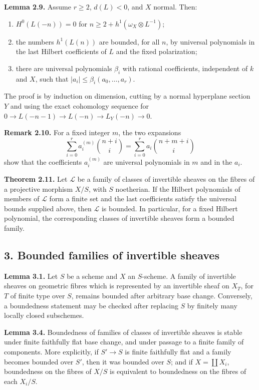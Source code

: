 \documentclass[11pt]{article}
\begin{document}
\textbf{Lemma 2.9.} Assume $r\ge2$, $d(L)<0$, and $X$ normal. Then:
\begin{enumerate}[label=\roman*)]
\item $H^0(L(-n))=0$ for $n\ge 2+h^1(\omega_X\otimes L^{-1})$;
\item the numbers $h^1(L(n))$ are bounded, for all $n$, by universal polynomials in the last Hilbert coefficients of $L$ and the fixed polarization;
\item there are universal polynomials $\beta_i$ with rational coefficients, independent of $k$ and $X$, such that $|a_i|\le\beta_i(a_0,\ldots,a_r)$.
\end{enumerate}
The proof is by induction on dimension, cutting by a normal hyperplane section $Y$ and using the exact cohomology sequence for $0\to L(-n-1)\to L(-n)\to L_Y(-n)\to0$.

\textbf{Remark 2.10.} For a fixed integer $m$, the two expansions
\[
 \sum_{i=0}^r a_i^{(m)}\binom{n+i}{i}=
 \sum_{i=0}^r a_i\binom{n+m+i}{i}
\]
show that the coefficients $a_i^{(m)}$ are universal polynomials in $m$ and in the $a_i$.

\textbf{Theorem 2.11.} Let $\mathcal L$ be a family of classes of invertible sheaves on the fibres of a projective morphism $X/S$, with $S$ noetherian. If the Hilbert polynomials of members of $\mathcal L$ form a finite set and the last coefficients satisfy the universal bounds supplied above, then $\mathcal L$ is bounded. In particular, for a fixed Hilbert polynomial, the corresponding classes of invertible sheaves form a bounded family.

\subsection*{3. Bounded families of invertible sheaves}
\textbf{Lemma 3.1.} Let $S$ be a scheme and $X$ an $S$-scheme. A family of invertible sheaves on geometric fibres which is represented by an invertible sheaf on $X_T$, for $T$ of finite type over $S$, remains bounded after arbitrary base change. Conversely, a boundedness statement may be checked after replacing $S$ by finitely many locally closed subschemes.

\textbf{Lemma 3.4.} Boundedness of families of classes of invertible sheaves is stable under finite faithfully flat base change, and under passage to a finite family of components. More explicitly, if $S'\to S$ is finite faithfully flat and a family becomes bounded over $S'$, then it was bounded over $S$; and if $X=\coprod X_i$, boundedness on the fibres of $X/S$ is equivalent to boundedness on the fibres of each $X_i/S$.
\end{document}
